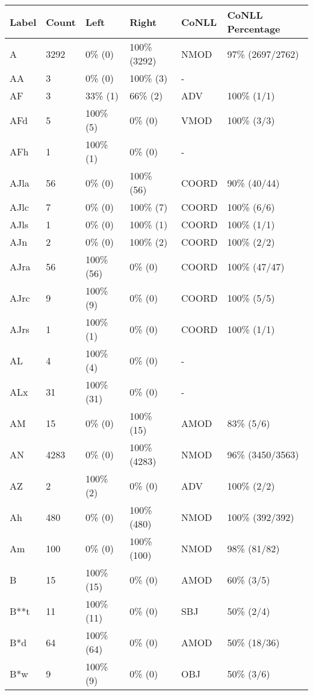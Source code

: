\begin{figure*}
\begin{tabular}{|l|l|l|l||l|l|}
\hline
Label & Count & Left & Right & CoNLL & CoNLL Percentage\\ 
\hline
 A & 3292 & 0\% (0) & 100\% (3292) & NMOD & 97\% (2697/2762) \\ 
\hline
 AA & 3 & 0\% (0) & 100\% (3) & - &  \\ 
\hline
 AF & 3 & 33\% (1) & 66\% (2) & ADV & 100\% (1/1) \\ 
\hline
 AFd & 5 & 100\% (5) & 0\% (0) & VMOD & 100\% (3/3) \\ 
\hline
 AFh & 1 & 100\% (1) & 0\% (0) & - &  \\ 
\hline
 AJla & 56 & 0\% (0) & 100\% (56) & COORD & 90\% (40/44) \\ 
\hline
 AJlc & 7 & 0\% (0) & 100\% (7) & COORD & 100\% (6/6) \\ 
\hline
 AJls & 1 & 0\% (0) & 100\% (1) & COORD & 100\% (1/1) \\ 
\hline
 AJn & 2 & 0\% (0) & 100\% (2) & COORD & 100\% (2/2) \\ 
\hline
 AJra & 56 & 100\% (56) & 0\% (0) & COORD & 100\% (47/47) \\ 
\hline
 AJrc & 9 & 100\% (9) & 0\% (0) & COORD & 100\% (5/5) \\ 
\hline
 AJrs & 1 & 100\% (1) & 0\% (0) & COORD & 100\% (1/1) \\ 
\hline
 AL & 4 & 100\% (4) & 0\% (0) & - &  \\ 
\hline
 ALx & 31 & 100\% (31) & 0\% (0) & - &  \\ 
\hline
 AM & 15 & 0\% (0) & 100\% (15) & AMOD & 83\% (5/6) \\ 
\hline
 AN & 4283 & 0\% (0) & 100\% (4283) & NMOD & 96\% (3450/3563) \\ 
\hline
 AZ & 2 & 100\% (2) & 0\% (0) & ADV & 100\% (2/2) \\ 
\hline
 Ah & 480 & 0\% (0) & 100\% (480) & NMOD & 100\% (392/392) \\ 
\hline
 Am & 100 & 0\% (0) & 100\% (100) & NMOD & 98\% (81/82) \\ 
\hline
 B & 15 & 100\% (15) & 0\% (0) & AMOD & 60\% (3/5) \\ 
\hline
 B**t & 11 & 100\% (11) & 0\% (0) & SBJ & 50\% (2/4) \\ 
\hline
 B*d & 64 & 100\% (64) & 0\% (0) & AMOD & 50\% (18/36) \\ 
\hline
 B*w & 9 & 100\% (9) & 0\% (0) & OBJ & 50\% (3/6) \\ 
\hline

\end{tabular}
\end{figure*}
